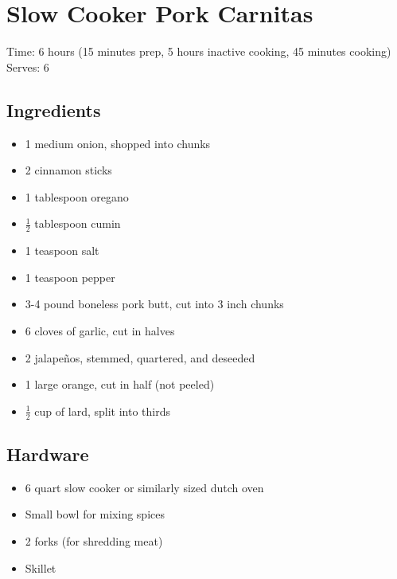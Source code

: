 \section{Slow Cooker Pork Carnitas}
\label{slowCookerPorkCarnitas}
Time: 6 hours (15 minutes prep, 5 hours inactive cooking, 45 minutes cooking)
Serves: 6

\begin{multicols}{2}
\subsection*{Ingredients}
\begin{itemize}
    \item 1 medium onion, shopped into chunks
    \item 2 cinnamon sticks
    \item 1 tablespoon oregano
    \item \( \frac{1}{2} \) tablespoon cumin
    \item 1 teaspoon salt
    \item 1 teaspoon pepper
    \item 3-4 pound boneless pork butt, cut into 3 inch chunks
    \item 6 cloves of garlic, cut in halves
    \item 2 jalapeños, stemmed, quartered, and deseeded
    \item 1 large orange, cut in half (not peeled)
    \item \( \frac{1}{2} \) cup of lard, split into thirds
\end{itemize}

\subsection*{Hardware}
\begin{itemize}
    \item 6 quart slow cooker or similarly sized dutch oven
    \item Small bowl for mixing spices
    \item 2 forks (for shredding meat)
    \item Skillet
\end{itemize}
\clearpage


\end{multicols}
